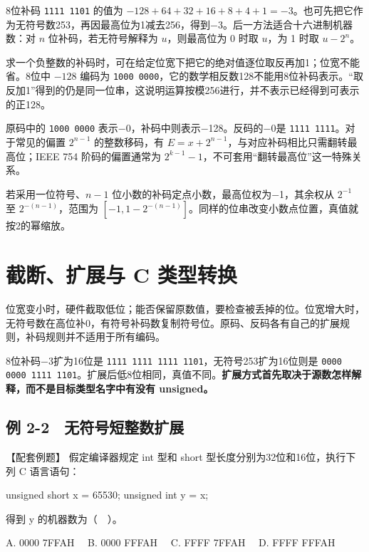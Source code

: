8位补码 \texttt{1111 1101} 的值为 \(-128+64+32+16+8+4+1=-3\)。也可先把它作为无符号数253，再因最高位为1减去256，得到\ensuremath{-}3。后一方法适合十六进制机器数：对 \(n\) 位补码，若无符号解释为 \(u\)，则最高位为 0 时取 \(u\)，为 1 时取 \(u-2^n\)。

求一个负整数的补码时，可在给定位宽下把它的绝对值逐位取反再加1；位宽不能省。8位中 \(-128\) 编码为 \texttt{1000 0000}，它的数学相反数128不能用8位补码表示。``取反加1''得到的仍是同一位串，这说明运算按模256进行，并不表示已经得到可表示的正128。

原码中的 \texttt{1000 0000} 表示\ensuremath{-}0，补码中则表示\ensuremath{-}128。反码的\ensuremath{-}0是 \texttt{1111 1111}。对于常见的偏置 \(2^{n-1}\) 的整数移码，有 \(E=x+2^{n-1}\)，与对应补码相比只需翻转最高位；IEEE 754 阶码的偏置通常为 \(2^{k-1}-1\)，不可套用``翻转最高位''这一特殊关系。

若采用一位符号、\(n-1\) 位小数的补码定点小数，最高位权为\ensuremath{-}1，其余权从 \(2^{-1}\) 至 \(2^{-(n-1)}\)，范围为 \([-1,1-2^{-(n-1)}]\)。同样的位串改变小数点位置，真值就按2的幂缩放。

\section{截断、扩展与 C 类型转换}\label{CO02-05}

位宽变小时，硬件截取低位；能否保留原数值，要检查被丢掉的位。位宽增大时，无符号数在高位补0，有符号补码数复制符号位。原码、反码各有自己的扩展规则，补码规则并不适用于所有编码。

8位补码\ensuremath{-}3扩为16位是 \texttt{1111 1111 1111 1101}，无符号253扩为16位则是 \texttt{0000 0000 1111 1101}。扩展后低8位相同，真值不同。\textbf{扩展方式首先取决于源数怎样解释，而不是目标类型名字中有没有 unsigned。}

\subsection{例 2-2　无符号短整数扩展}\label{CO02-06}

\begin{example}[配套例题]

【配套例题】 假定编译器规定 int 型和 short 型长度分别为32位和16位，执行下列 C 语言语句：

\par\medskip\noindent\begin{minipage}{\linewidth}
\begin{codeblock}[language=C]
unsigned short x = 65530;
unsigned int y = x;
\end{codeblock}
\end{minipage}\par\medskip

得到 y 的机器数为（　）。

A. 0000 7FFAH　 B. 0000 FFFAH　 C. FFFF 7FFAH　 D. FFFF FFFAH

\end{example}

